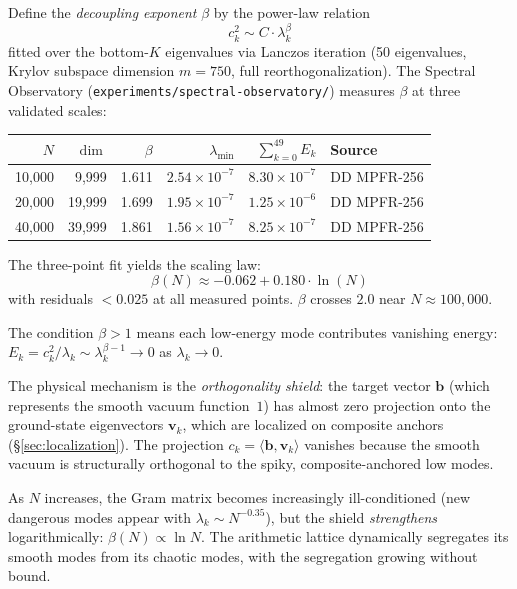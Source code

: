 \begin{correspondence}
\label{corr:decoupling}
Define the \emph{decoupling exponent} $\beta$ by the power-law relation
\[
  c_k^2 \sim C \cdot \lambda_k^\beta
\]
fitted over the bottom-$K$ eigenvalues via Lanczos iteration
(50 eigenvalues, Krylov subspace dimension $m = 750$, full
reorthogonalization). The Spectral Observatory
(\texttt{experiments/spectral-observatory/}) measures $\beta$ at
three validated scales:

\begin{center}
\small
\begin{tabular}{@{}rrrrrl@{}}
\toprule
$N$ & $\dim$ & $\beta$ & $\lambda_{\min}$ & $\sum_{k=0}^{49} E_k$ & Source \\
\midrule
10{,}000  & 9{,}999  & 1.611 & $2.54 \times 10^{-7}$ & $8.30 \times 10^{-7}$ & DD MPFR-256 \\
20{,}000  & 19{,}999 & 1.699 & $1.95 \times 10^{-7}$ & $1.25 \times 10^{-6}$ & DD MPFR-256 \\
40{,}000  & 39{,}999 & 1.861 & $1.56 \times 10^{-7}$ & $8.25 \times 10^{-7}$ & DD MPFR-256 \\
\bottomrule
\end{tabular}
\end{center}

The three-point fit yields the scaling law:
\begin{equation}
  \beta(N) \approx -0.062 + 0.180 \cdot \ln(N)
  \label{eq:beta-scaling}
\end{equation}
with residuals $< 0.025$ at all measured points.
$\beta$ crosses $2.0$ near $N \approx 100{,}000$.
\end{correspondence}

\begin{principle}
\label{princ:shield}
The condition $\beta > 1$ means each low-energy mode contributes
vanishing energy: $E_k = c_k^2/\lambda_k \sim \lambda_k^{\beta - 1} \to 0$
as $\lambda_k \to 0$.

The physical mechanism is the \emph{orthogonality shield}: the target
vector $\mathbf{b}$ (which represents the smooth vacuum function~$1$)
has almost zero projection onto the ground-state eigenvectors
$\mathbf{v}_k$, which are localized on composite anchors
(\S\ref{sec:localization}). The projection $c_k = \langle \mathbf{b},
\mathbf{v}_k \rangle$ vanishes because the smooth vacuum is
structurally orthogonal to the spiky, composite-anchored low modes.

As $N$ increases, the Gram matrix becomes increasingly ill-conditioned
(new dangerous modes appear with $\lambda_k \sim N^{-0.35}$), but
the shield \emph{strengthens} logarithmically: $\beta(N) \propto \ln N$.
The arithmetic lattice dynamically segregates its smooth modes from its
chaotic modes, with the segregation growing without bound.
\end{principle}

